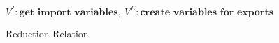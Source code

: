 \begin{figure}[h!]
\begin{mdframed}
    \footnotesize $\mathit{V}^I : \textbf{get  import variables},\: \mathit{V}^E : \textbf{create variables for exports}$
    \caption[ccc]{Reduction Relation \footnotemark}
    \label{fig:reduction}
  \end{mdframed}
\end{figure}

